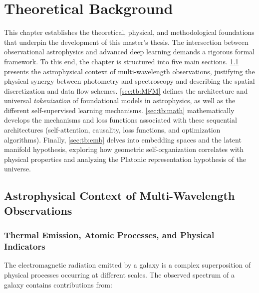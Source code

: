
\section{Theoretical Background}

This chapter establishes the theoretical, physical, and methodological foundations that underpin the development of this master's thesis. The intersection between observational astrophysics and advanced deep learning demands a rigorous formal framework. To this end, the chapter is structured into five main sections. \cref{sec:tb:context} presents the astrophysical context of multi-wavelength observations, justifying the physical synergy between photometry and spectroscopy and describing the spatial discretization and data flow schemes. \cref{sec:tb:MFM} defines the architecture and universal \textit{tokenization} of foundational models in astrophysics, as well as the different self-supervised learning mechanisms. \cref{sec:tb:math} mathematically develops the mechanisms and loss functions associated with these sequential architectures (self-attention, causality, loss functions, and optimization algorithms). Finally, \cref{sec:tb:emb} delves into embedding spaces and the latent manifold hypothesis, exploring how geometric self-organization correlates with physical properties and analyzing the Platonic representation hypothesis of the universe.

\subsection{Astrophysical Context of Multi-Wavelength Observations} \label{sec:tb:context}

\subsubsection{Thermal Emission, Atomic Processes, and Physical Indicators}

The electromagnetic radiation emitted by a galaxy is a complex superposition of physical processes occurring at different scales. The observed spectrum of a galaxy contains contributions from:

